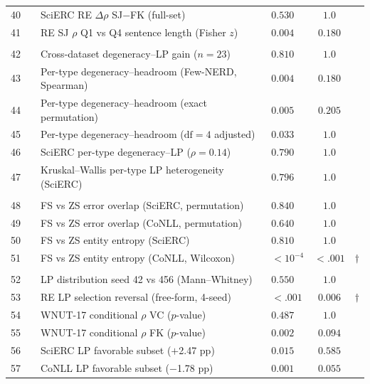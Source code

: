 \begin{table}[t]
\begin{tabular}{clllcc}
40 & & SciERC RE $\Delta\rho$ SJ$-$FK (full-set) & $0.530$ & $1.0$ &  \\
41 & & RE SJ $\rho$ Q1 vs Q4 sentence length (Fisher $z$) & $0.004$ & $0.180$ &  \\
\addlinespace
\multicolumn{6}{l}{\textit{Correlation}} \\
42 & & Cross-dataset degeneracy--LP gain ($n{=}23$) & $0.810$ & $1.0$ &  \\
43 & & Per-type degeneracy--headroom (Few-NERD, Spearman) & $0.004$ & $0.180$ &  \\
44 & & Per-type degeneracy--headroom (exact permutation) & $0.005$ & $0.205$ &  \\
45 & & Per-type degeneracy--headroom ($\text{df}{=}4$ adjusted) & $0.033$ & $1.0$ &  \\
46 & & SciERC per-type degeneracy--LP ($\rho{=}0.14$) & $0.790$ & $1.0$ &  \\
47 & & Kruskal--Wallis per-type LP heterogeneity (SciERC) & $0.796$ & $1.0$ &  \\
\addlinespace
\multicolumn{6}{l}{\textit{FS error}} \\
48 & & FS vs ZS error overlap (SciERC, permutation) & $0.840$ & $1.0$ &  \\
49 & & FS vs ZS error overlap (CoNLL, permutation) & $0.640$ & $1.0$ &  \\
50 & & FS vs ZS entity entropy (SciERC) & $0.810$ & $1.0$ &  \\
51 & & FS vs ZS entity entropy (CoNLL, Wilcoxon) & ${<}10^{-4}$ & ${<}.001$ & $\dagger$ \\
\addlinespace
\multicolumn{6}{l}{\textit{Other}} \\
52 & & LP distribution seed 42 vs 456 (Mann--Whitney) & $0.550$ & $1.0$ &  \\
53 & & RE LP selection reversal (free-form, 4-seed) & ${<}.001$ & $0.006$ & $\dagger$ \\
54 & & WNUT-17 conditional $\rho$ VC ($p$-value) & $0.487$ & $1.0$ &  \\
55 & & WNUT-17 conditional $\rho$ FK ($p$-value) & $0.002$ & $0.094$ &  \\
56 & & SciERC LP favorable subset ($+$2.47 pp) & $0.015$ & $0.585$ &  \\
57 & & CoNLL LP favorable subset ($-$1.78 pp) & $0.001$ & $0.055$ &  \\
\bottomrule
\end{tabular}
\end{table}
